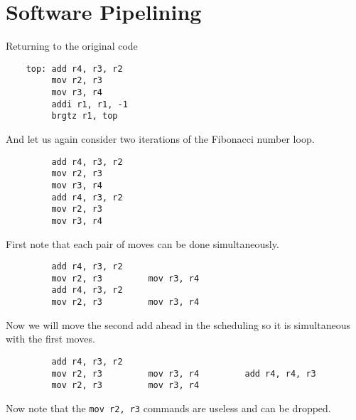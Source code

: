 


\section{Software Pipelining}

Returning to the original code

\begin{verbatim}
    top: add r4, r3, r2
         mov r2, r3
         mov r3, r4
         addi r1, r1, -1
         brgtz r1, top
\end{verbatim}

And let us again consider two iterations of the Fibonacci number loop.

\begin{verbatim}
         add r4, r3, r2
         mov r2, r3
         mov r3, r4
         add r4, r3, r2
         mov r2, r3
         mov r3, r4
\end{verbatim}

First note that each pair of moves can be done simultaneously.

\begin{verbatim}
         add r4, r3, r2
         mov r2, r3         mov r3, r4
         add r4, r3, r2
         mov r2, r3         mov r3, r4
\end{verbatim}

Now we will move the second add ahead in the scheduling so it is simultaneous with the first moves.

\begin{verbatim}
         add r4, r3, r2
         mov r2, r3         mov r3, r4         add r4, r4, r3
         mov r2, r3         mov r3, r4
\end{verbatim}

Now note that the \texttt{mov r2, r3} commands are useless and can be dropped.

